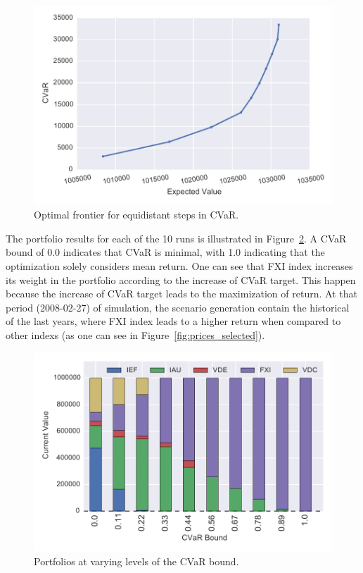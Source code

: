 \begin{figure}[tp]
\centering
\includegraphics{../pic/frontier.pdf}
\caption{Optimal frontier for equidistant steps in CVaR.}
\label{fig:frontier}
\end{figure}

The portfolio results for each of the 10 runs is illustrated in Figure~\ref{fig:scenarioreturn}.
A CVaR bound of 0.0 indicates that CVaR is minimal, with 1.0 indicating that the optimization solely considers mean return.
One can see that FXI index increases its weight in the portfolio according to the increase of CVaR target. 
This happen because the increase of CVaR target leads to the maximization of return.
At that period (2008-02-27) of simulation, the scenario generation contain the historical of the last years, where FXI index leads to a higher return when compared to other indexs (as one can see in Figure~\ref{fig:prices_selected}). 

\begin{figure}[tp]
\centering
\includegraphics{../pic/Stake_vs_CVaR.pdf}
\caption{Portfolios at varying levels of the CVaR bound.}
\label{fig:scenarioreturn}
\end{figure}


